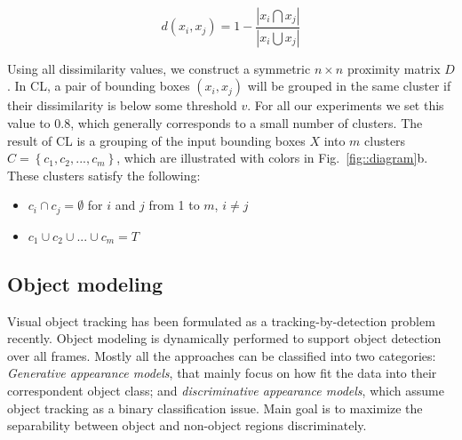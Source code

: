 \begin{equation}
d(x_i,x_j) = 1 - \frac{|x_i \bigcap x_j|}{|x_i \bigcup  x_j|}
\label{eq::diff}
\end{equation}

Using all dissimilarity values, we construct a symmetric $n \times n$ proximity
matrix $D$. In CL, a pair of bounding boxes $(x_i, x_j)$ will be grouped in
the same cluster if their dissimilarity is below some threshold $v$.
For all our experiments we set this value to $0.8$, which generally
corresponds to a small number of clusters.
The result of CL is a grouping of the input bounding boxes $X$ into 
$m$ clusters $C = \left \{ c_1, c_2, ..., c_m \right \}$,
which are illustrated with colors in Fig.~\ref{fig::diagram}b. These clusters
satisfy the following:
\begin{itemize}
\item $c_i \cap c_j = \emptyset$ for $i$ and $j$ from 1 to $m$, $i \neq j$
\item $c_1 \cup c_2 \cup ... \cup c_m = T$
\end{itemize}

\subsection{Object modeling}
Visual object tracking has been formulated as a tracking-by-detection problem
recently. Object modeling is dynamically performed to support object detection
over all frames. Mostly all the approaches can be classified into two categories:
\textit{Generative appearance models}, that mainly focus on how fit the data into
their correspondent object class; and \textit{discriminative appearance models},
which assume object tracking as a binary classification issue. Main goal is to
maximize the separability between object and non-object regions discriminately.

